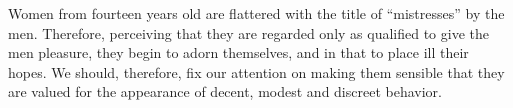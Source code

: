 Women from fourteen years old are flattered with the title of ``mistresses'' by
the men. Therefore, perceiving that they are regarded only as qualified to give
the men  pleasure, they  begin to adorn  themselves, and in  that to  place ill
their hopes.  We should, therefore, fix  our attention on making  them sensible
that  they  are valued  for  the  appearance  of  decent, modest  and  discreet
behavior.
